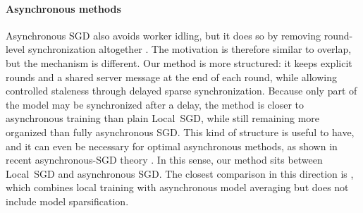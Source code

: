 \documentclass{article}
\newcommand{\R}{\mathbb{R}}  %
\newcommand{\Exp}[1]{{\mathbb{E}} \left[ #1 \right]}
\newcommand{\ammar}[1]{\todo[inline,bordercolor=pastelred,backgroundcolor=pastelred!20,linecolor=pastelred]{\textbf{Ammar: }#1}}
\theoremstyle{plain}
\theoremstyle{definition}
\newcommand{\algname}[1]{{\color{alggray}\small\sf#1}\xspace}
\newcommand{\sgd}{\algname{SGD}}
\newcommand{\localsgd}{\algname{Local~SGD}}
\begin{document}
\paragraph{Asynchronous methods}
Asynchronous \sgd also avoids worker idling, but it does so by removing round-level synchronization altogether \citep{agarwal2011distributed, recht2011hogwild, maranjyan2025thesis}.
The motivation is therefore similar to overlap, but the mechanism is different.
Our method is more structured: it keeps explicit rounds and a shared server message at the end of each round, while allowing controlled staleness through delayed sparse synchronization.
Because only part of the model may be synchronized after a delay, the method is closer to asynchronous training than plain \localsgd, while still remaining more organized than fully asynchronous \sgd.
This kind of structure is useful to have, and it can even be necessary for optimal asynchronous methods, as shown in recent asynchronous-\sgd theory \citep{tyurin2023optimal, maranjyan2025mindflayer, maranjyan2025ringmaster, maranjyan2026ringleader, mahran2026rescaled, sadiev2026ringmaster_lmo, tovmasyan2026rennala_mvr}.
In this sense, our method sits between \localsgd and asynchronous \sgd.
The closest comparison in this direction is \citet{tyurin2026birch}, which combines local training with asynchronous model averaging but does not include model sparsification.
% 
% 


% 
\end{document}
